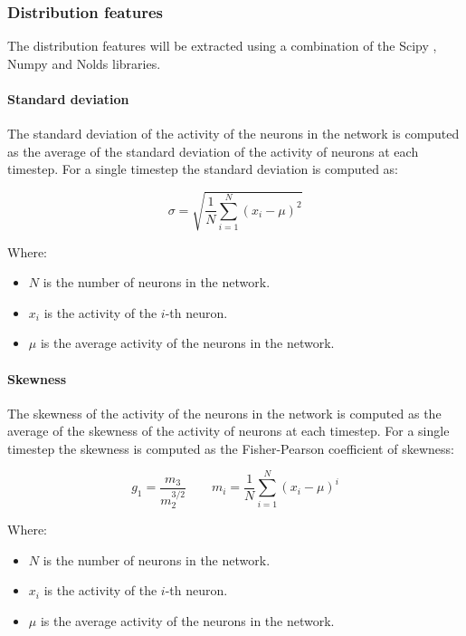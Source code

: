    \subsubsection{Distribution features}
    The distribution features will be extracted using a combination of the Scipy \cite{scipy}, Numpy \cite{numpy} and Nolds \cite{nolds} libraries.

      \paragraph{Standard deviation}
      \label{sec:std}
      The standard deviation of the activity of the neurons in the network is computed as the average of the standard deviation of the activity of neurons at each timestep.
      For a single timestep the standard deviation is computed as:

      \begin{equation}
        \sigma = \sqrt{\frac{1}{N}\sum_{i=1}^{N}(x_i - \mu)^2}
      \end{equation}

      Where:

      \begin{itemize}
        \item $N$ is the number of neurons in the network.
        \item $x_i$ is the activity of the $i$-th neuron.
        \item $\mu$ is the average activity of the neurons in the network.
      \end{itemize}

      \paragraph{Skewness}
      \label{sec:skewness}
      The skewness of the activity of the neurons in the network is computed as the average of the skewness of the activity of neurons at each timestep.
      For a single timestep the skewness is computed as the Fisher-Pearson coefficient of skewness:

      \begin{equation}
        g_1 = \frac{m_3}{m_2^{3/2}}\qquad m_i = \frac{1}{N}\sum_{i=1}^{N}(x_i - \mu)^i
      \end{equation}

      Where:

      \begin{itemize}
        \item $N$ is the number of neurons in the network.
        \item $x_i$ is the activity of the $i$-th neuron.
        \item $\mu$ is the average activity of the neurons in the network.
      \end{itemize}

